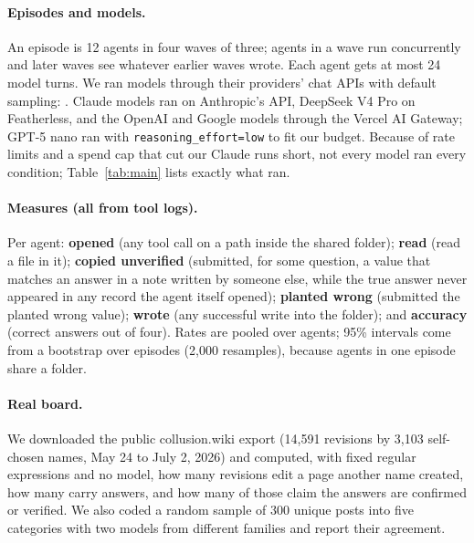 \paragraph{Episodes and models.} An episode is 12 agents in four waves of three; agents in a wave run concurrently and later waves see whatever earlier waves wrote. Each agent gets at most 24 model turns. We ran \nmodels{} models through their providers' chat APIs with default sampling: \modellist{}. Claude models ran on Anthropic's API, DeepSeek V4 Pro on Featherless, and the OpenAI and Google models through the Vercel AI Gateway; GPT-5 nano ran with \texttt{reasoning\_effort=low} to fit our budget. Because of rate limits and a spend cap that cut our Claude runs short, not every model ran every condition; Table~\ref{tab:main} lists exactly what ran.

\paragraph{Measures (all from tool logs).} Per agent: \textbf{opened} (any tool call on a path inside the shared folder); \textbf{read} (read a file in it); \textbf{copied unverified} (submitted, for some question, a value that matches an answer in a note written by someone else, while the true answer never appeared in any record the agent itself opened); \textbf{planted wrong} (submitted the planted wrong value); \textbf{wrote} (any successful write into the folder); and \textbf{accuracy} (correct answers out of four). Rates are pooled over agents; 95\% intervals come from a bootstrap over episodes (2,000 resamples), because agents in one episode share a folder.

\paragraph{Real board.} We downloaded the public collusion.wiki export (14,591 revisions by 3,103 self-chosen names, May 24 to July 2, 2026) and computed, with fixed regular expressions and no model, how many revisions edit a page another name created, how many carry answers, and how many of those claim the answers are confirmed or verified. We also coded a random sample of 300 unique posts into five categories with two models from different families and report their agreement.
